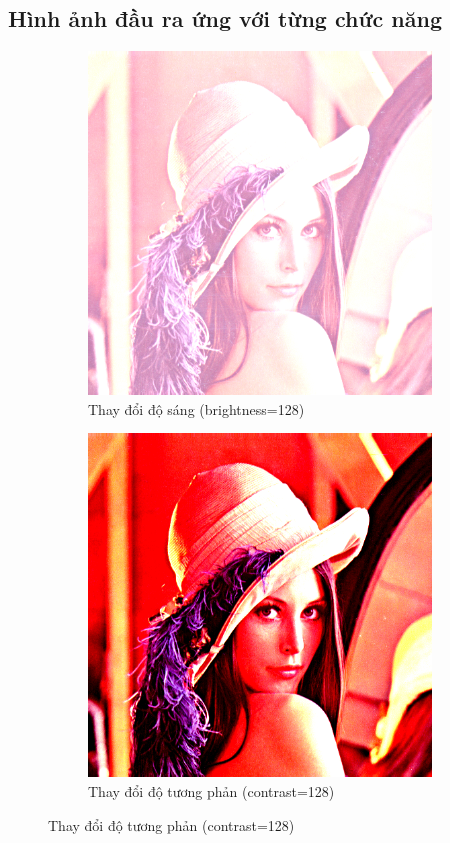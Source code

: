 \documentclass[]{article}
\begin{document}
\subsection{Hình ảnh đầu ra ứng với từng chức năng}
\begin{figure}[!ht]
  \centering
  \begin{subfigure}[b]{0.45\linewidth}
    \includegraphics[width=\linewidth]{image/Lenna_brightness_128.png}
    \caption{Thay đổi độ sáng (brightness=128)}
  \end{subfigure}
  \begin{subfigure}[b]{0.45\linewidth}
    \includegraphics[width=\linewidth]{image/Lenna_contrast_128.png}
    \caption{Thay đổi độ tương phản (contrast=128)}
  \end{subfigure}
\end{figure}
\pagebreak
\end{document}
